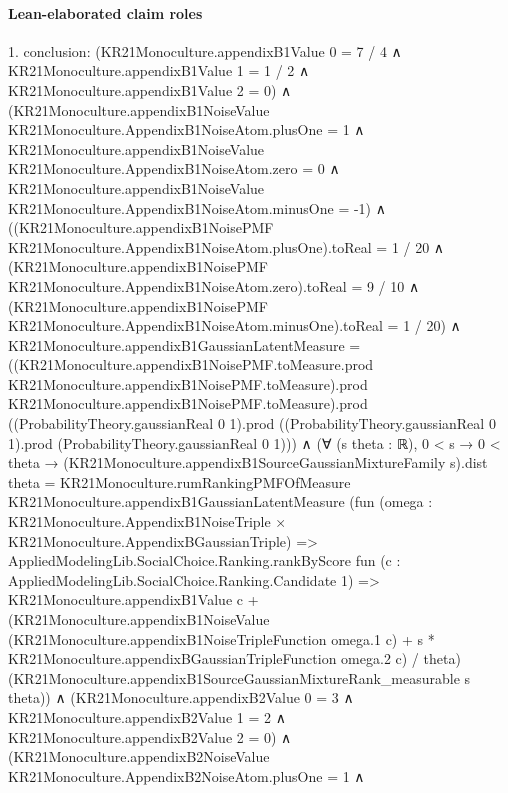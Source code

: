 \documentclass[10pt]{article}
\begin{document}
\paragraph{Lean-elaborated claim roles}\begin{ReviewVerbatim}
1. conclusion: (KR21Monoculture.appendixB1Value 0 = 7 / 4 ∧
    KR21Monoculture.appendixB1Value 1 = 1 / 2 ∧ KR21Monoculture.appendixB1Value 2 = 0) ∧
  (KR21Monoculture.appendixB1NoiseValue KR21Monoculture.AppendixB1NoiseAtom.plusOne = 1 ∧
      KR21Monoculture.appendixB1NoiseValue KR21Monoculture.AppendixB1NoiseAtom.zero = 0 ∧
        KR21Monoculture.appendixB1NoiseValue KR21Monoculture.AppendixB1NoiseAtom.minusOne = -1) ∧
    ((KR21Monoculture.appendixB1NoisePMF KR21Monoculture.AppendixB1NoiseAtom.plusOne).toReal = 1 / 20 ∧
        (KR21Monoculture.appendixB1NoisePMF KR21Monoculture.AppendixB1NoiseAtom.zero).toReal = 9 / 10 ∧
          (KR21Monoculture.appendixB1NoisePMF KR21Monoculture.AppendixB1NoiseAtom.minusOne).toReal = 1 / 20) ∧
      KR21Monoculture.appendixB1GaussianLatentMeasure =
          ((KR21Monoculture.appendixB1NoisePMF.toMeasure.prod KR21Monoculture.appendixB1NoisePMF.toMeasure).prod
                KR21Monoculture.appendixB1NoisePMF.toMeasure).prod
            ((ProbabilityTheory.gaussianReal 0 1).prod
              ((ProbabilityTheory.gaussianReal 0 1).prod (ProbabilityTheory.gaussianReal 0 1))) ∧
        (∀ (s theta : ℝ),
            0 < s →
              0 < theta →
                (KR21Monoculture.appendixB1SourceGaussianMixtureFamily s).dist theta =
                  KR21Monoculture.rumRankingPMFOfMeasure KR21Monoculture.appendixB1GaussianLatentMeasure
                    (fun (omega : KR21Monoculture.AppendixB1NoiseTriple × KR21Monoculture.AppendixBGaussianTriple) =>
                      AppliedModelingLib.SocialChoice.Ranking.rankByScore
                        fun (c : AppliedModelingLib.SocialChoice.Ranking.Candidate 1) =>
                        KR21Monoculture.appendixB1Value c +
                          (KR21Monoculture.appendixB1NoiseValue
                                (KR21Monoculture.appendixB1NoiseTripleFunction omega.1 c) +
                              s * KR21Monoculture.appendixBGaussianTripleFunction omega.2 c) /
                            theta)
                    (KR21Monoculture.appendixB1SourceGaussianMixtureRank_measurable s theta)) ∧
          (KR21Monoculture.appendixB2Value 0 = 3 ∧
              KR21Monoculture.appendixB2Value 1 = 2 ∧ KR21Monoculture.appendixB2Value 2 = 0) ∧
            (KR21Monoculture.appendixB2NoiseValue KR21Monoculture.AppendixB2NoiseAtom.plusOne = 1 ∧

\end{ReviewVerbatim}
\end{document}

